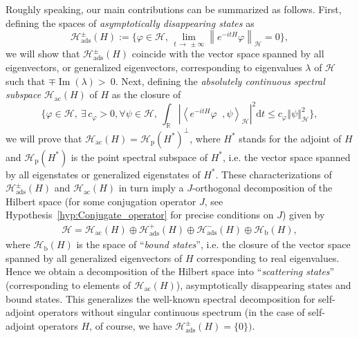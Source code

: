 \documentclass[AHL,Unicode,longabstracts,published]{cedram}
\newcommand{\Hi}{\mathcal{H}}
\newcommand{\R}{\mathbb{R}}
\newcommand{\rmp}{\mathrm{p}}
\newcommand{\acr}{\mathrm{ac}}
\newcommand{\ads}{\mathrm{ads}}
\newcommand{\rmd}{\mathrm{d}}
\newcommand{\rmb}{\mathrm{b}}
\newcommand{\norme}[1]{\left\Vert #1\right\Vert}
\newcommand{\scal}[2]{\left\langle{#1} \middle., {#2}\right\rangle}
\newcommand{\abso}[1]{\left|{#1}\right|}
\DeclareMathOperator{\im}{Im}
\let\oldexists\exists
\renewcommand*{\exists}{\mathrel{\oldexists}}
\let\oldforall\forall
\renewcommand*{\forall}{\mathrel{\oldforall}}
\newcommand{\Hi}{\mathcal{H}}
\newcommand{\rmp}{\mathrm{p}}
\newcommand{\R}{\mathbb{R}}
\DeclareMathOperator{\im}{Im}
\newcommand{\acr}{\mathrm{ac}}
\begin{document}
Roughly speaking, our main contributions can be summarized as follows. First, defining the spaces of \emph{asymptotically disappearing states} as
\begin{equation*}
\Hi_{\ads}^\pm(H):=\Big\{\varphi\in\Hi, \, \lim_{t\,\to\,\pm\infty}\left\|e^{-itH}\varphi\right\|_\Hi=0\Big\},
\end{equation*}
we will show that $\Hi_{\ads}^\pm(H)$ coincide with the vector space spanned by all eigenvectors, or generalized eigenvectors, corresponding to eigenvalues $\lambda$ of $\Hi$ such that $\mp\im(\lambda)>~0$. Next, defining the \emph{absolutely continuous spectral subspace} $\Hi_{\acr}(H)$ of $H$ as the closure of
\begin{equation*}
\Big\lbrace \varphi\in\Hi,~\exists\, c_\varphi>0,\forall \psi\in\Hi,~\int_\R\abso{\scal{e^{-itH}\varphi}{\psi}_\Hi}^2\rmd t\leq c_\varphi\norme{\psi}^2_\Hi \Big\rbrace,
\end{equation*}
we will prove that $\Hi_{\acr}(H)=\Hi_{\rmp}(H^*)^\perp$, where $H^*$ stands for the adjoint of $H$ and $\Hi_{\rmp}(H^*)$ is the point spectral subspace of $H^*$, i.e. the vector space spanned by all eigenstates or generalized eigenstates of $H^*$. These characterizations of $\Hi_{\ads}^\pm(H)$ and $\Hi_{\acr}(H)$ in turn imply a $J$-orthogonal decomposition of the Hilbert space (for some conjugation operator $J$, see Hypothesis~\ref{hyp:Conjugate_operator} for precise conditions on $J$) given by
\begin{align}\label{eq:spec-decom-intro}
\Hi = \Hi_{\acr}(H) \oplus \Hi_{\ads}^+(H)\oplus\Hi_{\ads}^-(H)\oplus\Hi_{\rmb}(H),
\end{align}
where $\Hi_{\rmb}(H)$ is the space of ``\emph{bound states}'', i.e. the closure of the vector space spanned by all generalized eigenvectors of $H$ corresponding to real eigenvalues. Hence we obtain a decomposition of the Hilbert space into ``\emph{scattering states}'' (corresponding to elements of $\Hi_{\acr}(H)$), asymptotically disappearing states and bound states. This generalizes the well-known spectral decomposition for self-adjoint operators without singular continuous spectrum (in the case of self-adjoint operators $H$, of course, we have $\Hi_{\ads}^\pm(H)=\{0\})$.
\end{document}

